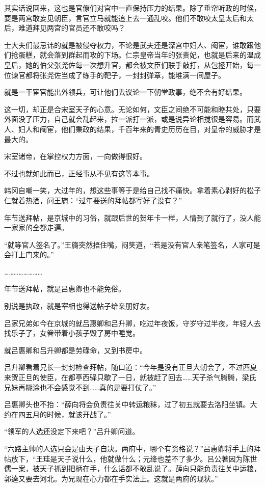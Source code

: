 其实话说回来，这也是官僚们对宫中一直保持压力的结果。除了垂帘听政的时候，要是两宫敢妄见朝臣，言官立马就能追上去一通乱咬。他们不敢咬太皇太后和太后，难道拜见两宫的官员还不敢咬吗？

士大夫们最忌讳的就是被侵夺权力，不论是武夫还是深宫中妇人、阉宦，谁敢跟他们抢蛋糕，就会落到群起而攻的下场。仁宗皇帝当年的张贵妃，也就是后来的温成皇后，她的伯父张尧佐每一次想升官，都会被文臣们联手敲打，从包拯开始，每一位谏官都将张尧佐当成了练手的靶子，一封封弹章，能堆满一间屋子。

就是一干宦官能出外领兵，可让他们去议论一下朝堂政事，绝不会有好结果。

这一切，却正是合宋室天子的心意。无论如何，文臣之间绝不可能和睦共处，只要外面没了压力，自己就会乱起来，拉一派打一派，或是说异论相搅很是容易。而武人、妇人和阉宦，他们秉政的结果，千百年来的青史历历在目，对皇帝的威胁才是最大的。

宋室诸帝，在掌控权力方面，一向做得很好。

不过也就如此而已，正经事从不见有这等本事。

韩冈自嘲一笑，大过年的，想这些事等于是给自己找不痛快。拿着素心剥好的松子仁就着热酒，问王旖：“过年要送的拜帖都写好了没有？”

年节送拜帖，是京城中的习俗，就跟后世的贺年卡一样，人情到了就行了，没人能一家家的全都走遍。

“就等官人签名了。”王旖突然捂住嘴，闷笑道，“若是没有官人亲笔签名，人家可是会打上门来的。”

……………………

年节送拜帖，就是吕惠卿也不能免俗。

别说是执政，就是宰相也得送帖子给亲朋好友。

吕家兄弟如今在京城的就吕惠卿和吕升卿，吃过年夜饭，守岁守过半夜，年轻人去找乐子了，女眷带着小孩子毁了房中睡觉。

就吕惠卿和吕升卿都是劳碌命，又到书房中。

吕升卿看着兄长一封封检查拜帖，随口道：“今年是没有正旦大朝会了，不过西夏来贺正旦的使臣，在都亭西驿只歇了一日，就被赶了回去……天子杀气腾腾，梁氏兄妹再糊涂也不会感觉不到……真的是要打仗了。”

吕惠卿头也不抬：“薛向将会负责往关中转运粮秣，过了初五就要去洛阳坐镇。大约在四五月的时候，就该开战了。”

“领军的人选还没定下来吧？”吕升卿问道。

“六路主帅的人选只会是由天子自决。两府中，哪个有资格说？”吕惠卿将手上的拜帖放下，“王珪是天子说什么，他就做什么；元绛也差不了多少。吕公著因为陈世儒一案，被天子抓到把柄在手，什么话都不敢乱说了。薛向只能负责往关中运粮，郭逵又要去河北。为兄现在心力都在手实法上。这就是两府的现状。”

